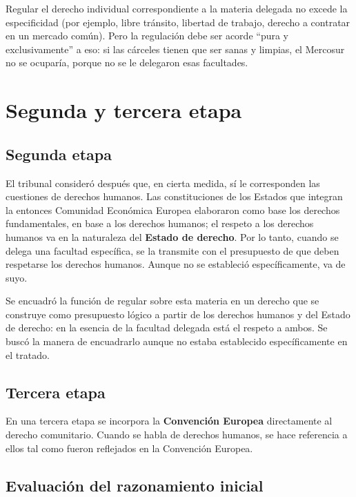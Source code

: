 \documentclass[12pt,oneside]{book}
\begin{document}
\begin{important}
Regular el derecho individual correspondiente a la materia delegada no excede la especificidad (por ejemplo, libre tránsito, libertad de trabajo, derecho a contratar en un mercado común). Pero la regulación debe ser acorde ``pura y exclusivamente'' a eso: si las cárceles tienen que ser sanas y limpias, el Mercosur no se ocuparía, porque no se le delegaron esas facultades.
\end{important}

\section{Segunda y tercera etapa}

\subsection{Segunda etapa}

El tribunal consideró después que, en cierta medida, sí le corresponden las cuestiones de derechos humanos. Las constituciones de los Estados que integran la entonces Comunidad Económica Europea elaboraron como base los derechos fundamentales, en base a los derechos humanos; el respeto a los derechos humanos va en la naturaleza del \textbf{Estado de derecho}. Por lo tanto, cuando se delega una facultad específica, se la transmite con el presupuesto de que deben respetarse los derechos humanos. Aunque no se estableció específicamente, va de suyo.

Se encuadró la función de regular sobre esta materia en un derecho que se construye como presupuesto lógico a partir de los derechos humanos y del Estado de derecho: en la esencia de la facultad delegada está el respeto a ambos. Se buscó la manera de encuadrarlo aunque no estaba establecido específicamente en el tratado.

\subsection{Tercera etapa}

En una tercera etapa se incorpora la \textbf{Convención Europea} directamente al derecho comunitario. Cuando se habla de derechos humanos, se hace referencia a ellos tal como fueron reflejados en la Convención Europea.

\subsection{Evaluación del razonamiento inicial}
\end{document}
